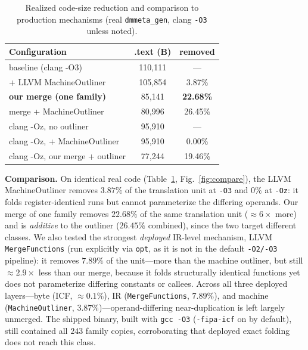 \documentclass[conference]{IEEEtran}
\newcommand{\tu}{\texttt{dmmeta\_gen}}
\begin{document}
\begin{table}[t]\centering
\caption{Realized code-size reduction and comparison to production mechanisms
(real \tu, clang \texttt{-O3} unless noted).}
\label{tab:realized}
\begin{tabular}{@{}lcc@{}}\toprule
\textbf{Configuration} & \textbf{.text (B)} & \textbf{removed}\\\midrule
baseline (clang -O3)                 & 110{,}111 & ---\\
+ LLVM MachineOutliner               & 105{,}854 & 3.87\%\\
\textbf{our merge (one family)}      & 85{,}141  & \textbf{22.68\%}\\
merge + MachineOutliner              & 80{,}996  & 26.45\%\\\midrule
clang -Oz, no outliner               & 95{,}910  & ---\\
clang -Oz, + MachineOutliner         & 95{,}910  & 0.00\%\\
clang -Oz, our merge + outliner      & 77{,}244  & 19.46\%\\\bottomrule
\end{tabular}
\end{table}

\textbf{Comparison.} On identical real code (Table~\ref{tab:realized},
Fig.~\ref{fig:compare}), the LLVM MachineOutliner removes $3.87\%$ of the
translation unit at \texttt{-O3} and $0\%$ at \texttt{-Oz}: it folds
register-identical runs but cannot parameterize the differing operands. Our
merge of one family removes $22.68\%$ of the same translation unit
(${\approx}6\times$ more) and is \emph{additive} to the outliner ($26.45\%$
combined), since the two target different classes. We also tested the strongest
\emph{deployed} IR-level mechanism, LLVM \texttt{MergeFunctions} (run explicitly
via \texttt{opt}, as it is not in the default \texttt{-O2/-O3} pipeline): it
removes $7.89\%$ of the unit---more than the machine outliner, but still
${\approx}2.9\times$ less than our merge, because it folds structurally
identical functions yet does not parameterize differing constants or callees.
Across all three deployed layers---byte (ICF, ${\approx}0.1\%$), IR
(\texttt{MergeFunctions}, $7.89\%$), and machine (\texttt{MachineOutliner},
$3.87\%$)---operand-differing near-duplication is left largely unmerged. The shipped
binary, built with \texttt{gcc -O3} (\texttt{-fipa-icf} on by default), still
contained all $243$ family copies, corroborating that deployed exact folding
does not reach this class.
\end{document}
